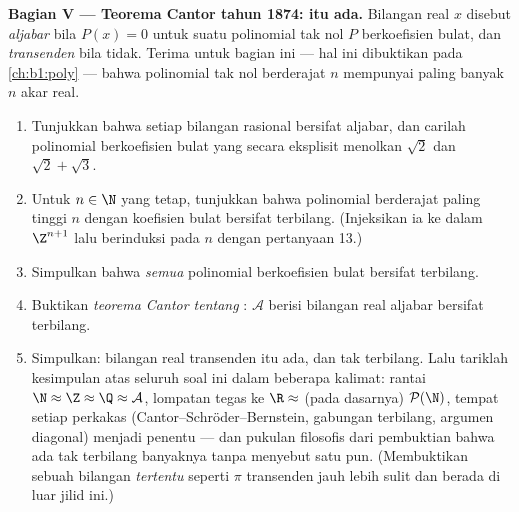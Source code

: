 \begin{problem}
\medskip
\noindent\textbf{Bagian V --- Teorema Cantor tahun 1874:  itu ada.} Bilangan real $x$ disebut \emph{aljabar}
 bila $P(x) = 0$ untuk suatu polinomial tak
nol $P$ berkoefisien bulat, dan \emph{transenden}
 bila tidak. Terima untuk bagian ini ---
hal ini dibuktikan pada \cref{ch:b1:poly} --- bahwa polinomial tak nol
berderajat $n$ mempunyai paling banyak $n$ akar real.
\begin{enumerate}[resume]
  \item Tunjukkan bahwa setiap bilangan rasional bersifat aljabar, dan
        carilah polinomial berkoefisien bulat yang secara eksplisit
        menolkan $\sqrt 2$ dan $\sqrt 2 + \sqrt 3$.
  \item Untuk $n \in \N$ yang tetap, tunjukkan bahwa 
        polinomial berderajat paling tinggi $n$ dengan koefisien bulat
        bersifat terbilang. (Injeksikan ia ke dalam $\Z^{n+1}$ lalu
        berinduksi pada $n$ dengan pertanyaan 13.)
  \item Simpulkan bahwa  \emph{semua} polinomial berkoefisien
        bulat bersifat terbilang.
  \item Buktikan \emph{teorema Cantor tentang }:
         $\mathcal{A}$ berisi bilangan real aljabar bersifat
        terbilang.
  \item Simpulkan: bilangan real transenden itu ada, dan 
         tak terbilang. Lalu tariklah kesimpulan
        atas seluruh soal ini dalam beberapa kalimat: rantai
        $\N \approx
        \Z \approx \Q \approx \mathcal{A}$, lompatan tegas ke $\R
        \approx$ (pada dasarnya) $\mathcal{P}(\N)$, tempat setiap
        perkakas (Cantor--Schröder--Bernstein, gabungan terbilang,
        argumen diagonal) menjadi penentu --- dan pukulan filosofis
        dari pembuktian bahwa ada tak terbilang banyaknya  tanpa menyebut satu pun. (Membuktikan sebuah
        bilangan \emph{tertentu} seperti $\pi$ transenden jauh lebih
        sulit dan berada di luar jilid ini.)

\end{enumerate}
\end{problem}
